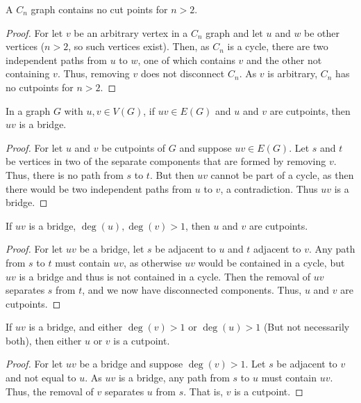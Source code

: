     \begin{theorem}
    A $C_n$ graph contains no cut points for $n>2$.
    \end{theorem}
    \begin{proof}
    For let $v$ be an arbitrary vertex in a $C_n$ graph and let $u$ and $w$ be other vertices ($n>2$, so such vertices exist). Then, as $C_n$ is a cycle, there are two independent paths from $u$ to $w$, one of which contains $v$ and the other not containing $v$. Thus, removing $v$ does not disconnect $C_n$. As $v$ is arbitrary, $C_n$ has no cutpoints for $n>2$.
    \end{proof}
    \begin{theorem}
    In a graph $G$ with $u,v\in V(G)$, if $uv\in E(G)$ and $u$ and $v$ are cutpoints, then $uv$ is a bridge.
    \end{theorem}
    \begin{proof}
    For let $u$ and $v$ be cutpoints of $G$ and suppose $uv\in E(G)$. Let $s$ and $t$ be vertices in two of the separate components that are formed by removing $v$. Thus, there is no path from $s$ to $t$. But then $uv$ cannot be part of a cycle, as then there would be two independent paths from $u$ to $v$, a contradiction. Thus $uv$ is a bridge.
    \end{proof}
    \begin{theorem}
    If $uv$ is a bridge, $\deg(u),\deg(v)>1$, then $u$ and $v$ are cutpoints.
    \end{theorem}
    \begin{proof}
    For let $uv$ be a bridge, let $s$ be adjacent to $u$ and $t$ adjacent to $v$. Any path from $s$ to $t$ must contain $uv$, as otherwise $uv$ would be contained in a cycle, but $uv$ is a bridge and thus is not contained in a cycle. Then the removal of $uv$ separates $s$ from $t$, and we now have disconnected components. Thus, $u$ and $v$ are cutpoints.
    \end{proof}
    \begin{theorem}
    If $uv$ is a bridge, and either $\deg(v)>1$ or $\deg(u)>1$ (But not necessarily both), then either $u$ or $v$ is a cutpoint.
    \end{theorem}
    \begin{proof}
    For let $uv$ be a bridge and suppose $\deg(v)>1$. Let $s$ be adjacent to $v$ and not equal to $u$. As $uv$ is a bridge, any path from $s$ to $u$ must contain $uv$. Thus, the removal of $v$ separates $u$ from $s$. That is, $v$ is a cutpoint.
    \end{proof}
